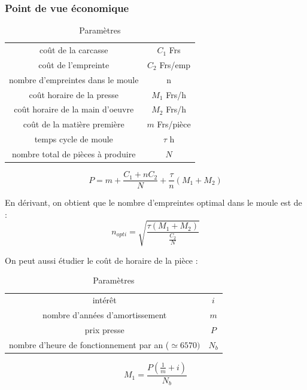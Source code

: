 \documentclass[../main.tex]{subfiles}
\begin{document}
\subsubsection{Point de vue économique}
\begin{table}[hbt!]
    \centering
    \begin{tabular}{c|c}
    coût de la carcasse & $C_1$ Frs\\
    coût de l'empreinte & $C_2$ Frs/emp\\
    nombre d'empreintes dans le moule & n\\
    coût horaire de la presse & $M_1$ Frs/h\\
    coût horaire de la main d'oeuvre & $M_2$ Frs/h\\
    coût de la matière première & $m$ Frs/pièce\\
    temps cycle de moule & $\tau$ h\\
    nombre total de pièces à produire & $N$\\
    \end{tabular}
    \caption{Paramètres}
\end{table}

\begin{equation}
    P = m + \frac{C_1 + n C_2}{N} + \frac{\tau}{n}(M_1+M_2)
\end{equation}

En dérivant, on obtient que le nombre d'empreintes optimal dans le moule est de : \begin{equation}
    n_{opti} = \sqrt{\frac{\tau (M_1+M_2)}{\frac{C_2}{N}}}
\end{equation}

On peut aussi étudier le coût de horaire de la pièce :\\
\begin{table}[hbt!]
    \centering
    \begin{tabular}{c|c}
    intérêt & $i$\\
    nombre d'années d'amortissement & $m$\\
    prix presse & $P$\\
    nombre d'heure de fonctionnement par an ($\simeq 6570)$ & $N_b$
    \end{tabular}
    \caption{Paramètres}
\end{table}

\begin{equation}
    M_1 = \frac{P(\frac{1}{m} + i)}{N_b}
\end{equation}
\end{document}
